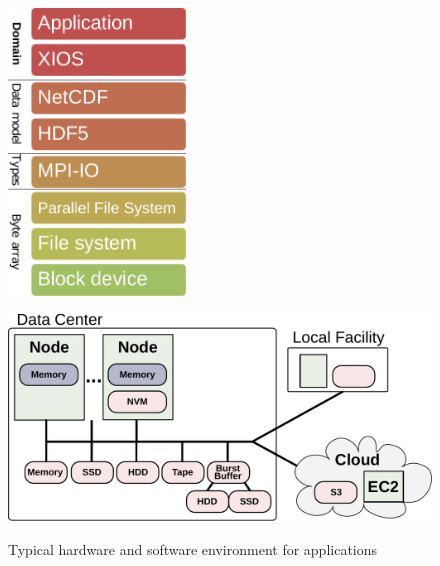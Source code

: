 \documentclass{superfri}
\begin{document}
\begin{figure}[b]
    \begin{minipage}{.42\linewidth}
        \centering
        \includegraphics[width=0.42\textwidth]{pic/layers-xios}
        \label{pic/layers-xios}
    \end{minipage}
    \begin{minipage}{.58\linewidth}
        \centering
        \includegraphics[width=1\textwidth]{pic/system}
        \label{pic/system}
    \end{minipage}
    \vspace{5pt}
    \caption{Typical hardware and software environment for applications}
    \label{fig:34}
\end{figure}

\end{document}
